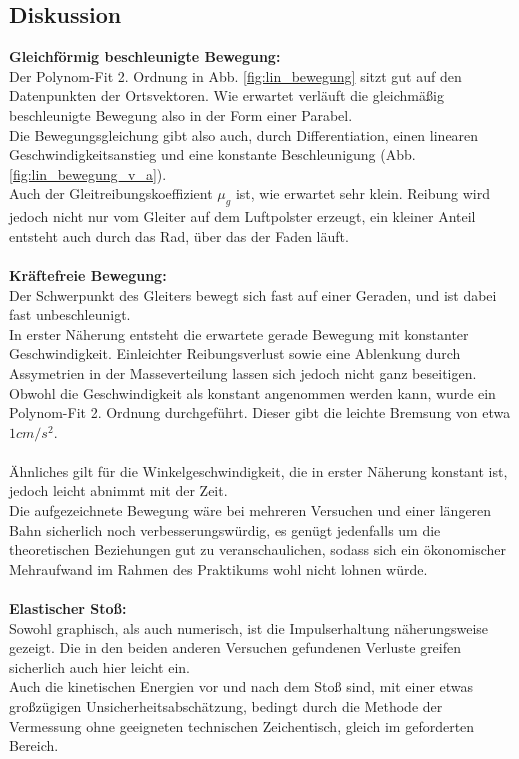 \documentclass[12pt,a4paper]{article}
\begin{document}
\begin{multicols}{2}
\subsection{Diskussion}
\textbf{Gleichförmig beschleunigte Bewegung:}\\
Der Polynom-Fit 2. Ordnung in Abb. \ref{fig:lin_bewegung} sitzt gut auf den Datenpunkten der Ortsvektoren. Wie erwartet verläuft die gleichmäßig beschleunigte Bewegung also in der Form einer Parabel.\\
Die Bewegungsgleichung gibt also auch, durch Differentiation, einen linearen Geschwindigkeitsanstieg und eine konstante Beschleunigung (Abb. \ref{fig:lin_bewegung_v_a}).\\
Auch der Gleitreibungskoeffizient $\mu_g$ ist, wie erwartet sehr klein. Reibung wird jedoch nicht nur vom Gleiter auf dem Luftpolster erzeugt, ein kleiner Anteil entsteht auch durch das Rad, über das der Faden läuft.\\
\\
\textbf{Kräftefreie Bewegung:}\\
Der Schwerpunkt des Gleiters bewegt sich fast auf einer Geraden, und ist dabei fast unbeschleunigt.\\
In erster Näherung entsteht die erwartete gerade Bewegung mit konstanter Geschwindigkeit. Einleichter Reibungsverlust sowie eine Ablenkung durch Assymetrien in der Masseverteilung lassen sich jedoch nicht ganz beseitigen.\\
Obwohl die Geschwindigkeit als konstant angenommen werden kann, wurde ein Polynom-Fit 2. Ordnung durchgeführt. Dieser gibt die leichte Bremsung von etwa $1cm/s^2$.\\
\\
Ähnliches gilt für die Winkelgeschwindigkeit, die in erster Näherung konstant ist, jedoch leicht abnimmt mit der Zeit.\\
Die aufgezeichnete Bewegung wäre bei mehreren Versuchen und einer längeren Bahn sicherlich noch verbesserungswürdig, es genügt jedenfalls um die theoretischen Beziehungen gut zu veranschaulichen, sodass sich ein ökonomischer Mehraufwand im Rahmen des Praktikums wohl nicht lohnen würde.\\
\\
\textbf{Elastischer Stoß:}\\
Sowohl graphisch, als auch numerisch, ist die Impulserhaltung näherungsweise gezeigt. Die in den beiden anderen Versuchen gefundenen Verluste greifen sicherlich auch hier leicht ein.\\
Auch die kinetischen Energien vor und nach dem Stoß sind, mit einer etwas großzügigen Unsicherheitsabschätzung, bedingt durch die Methode der Vermessung ohne geeigneten technischen Zeichentisch, gleich im geforderten Bereich.\\

\end{multicols}
\end{document}
